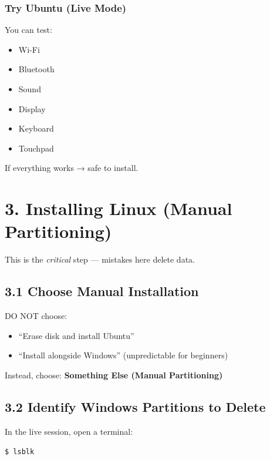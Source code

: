 \documentclass[12pt]{article}
\begin{document}
\subsubsection*{Try Ubuntu (Live Mode)}

You can test:

\begin{itemize}
    \item Wi-Fi
    \item Bluetooth
    \item Sound
    \item Display
    \item Keyboard
    \item Touchpad
\end{itemize}

\begin{warningbox}
If everything works → safe to install.
\end{warningbox}

\section*{3. Installing Linux (Manual Partitioning)}

This is the \textit{critical} step — mistakes here delete data.

\subsection*{3.1 Choose Manual Installation}

DO NOT choose:

\begin{itemize}
    \item ``Erase disk and install Ubuntu''
    \item ``Install alongside Windows'' (unpredictable for beginners)
\end{itemize}

Instead, choose: \textbf{Something Else (Manual Partitioning)}

\subsection*{3.2 Identify Windows Partitions to Delete}

In the live session, open a terminal:

\begin{highlightbox}
\texttt{\$ lsblk}
\end{highlightbox}
\end{document}
